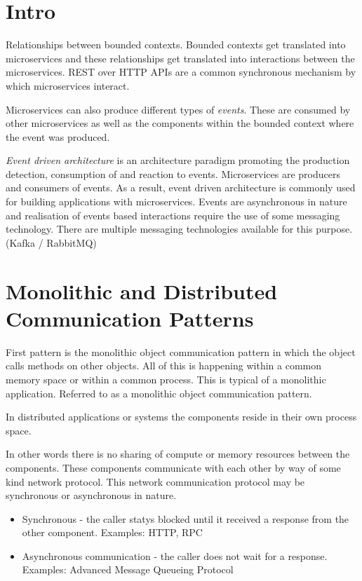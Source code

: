 \section{Intro}
Relationships between bounded contexts.
Bounded contexts get translated into microservices and these relationships get translated into interactions between the microservices.
REST over HTTP APIs are a common synchronous mechanism by which microservices interact.

Microservices can also produce different types of \textit{events}.
These are consumed by other microservices as well as the components within the bounded context where the event was produced.

\textit{Event driven architecture} is an architecture paradigm promoting the production detection, consumption of and reaction to events.
Microservices are producers and consumers of events.
As a result, event driven architecture is commonly used for building applications with microservices.
Events are asynchronous in nature and realisation of events based interactions require the use of some messaging technology.
There are multiple messaging technologies available for this purpose. (Kafka / RabbitMQ)


\section{Monolithic and Distributed Communication Patterns}
First pattern is the monolithic object communication pattern in which the object calls methods on other objects.
All of this is happening within a common memory space or within a common process.
This is typical of a monolithic application.
Referred to as a monolithic object communication pattern.

\begin{note}
    In distributed applications or systems the components reside in their own process space.
\end{note}
In other words there is no sharing of compute or memory resources between the components.
These components communicate with each other by way of some kind network protocol.
This network communication protocol may be synchronous or asynchronous in nature.
\begin{itemize}
    \item Synchronous - the caller statys blocked until it received a response from the other component. Examples: HTTP, RPC
    \item Asynchronous communication - the caller does not wait for a response. Examples: Advanced Message Queueing Protocol
\end{itemize}

